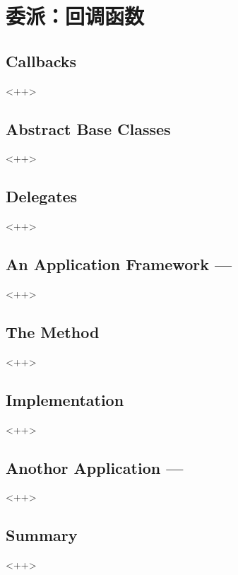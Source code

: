 

\chapter{委派：回调函数}
\label{ch:Delegates}

\section{Callbacks}<++>

\section{Abstract Base Classes}<++>

\section{Delegates}<++>

\section{An Application Framework ---}<++>

\section{The  Method}<++>

\section{Implementation}<++>

\section{Anothor Application ---}<++>

\section{Summary}<++>

